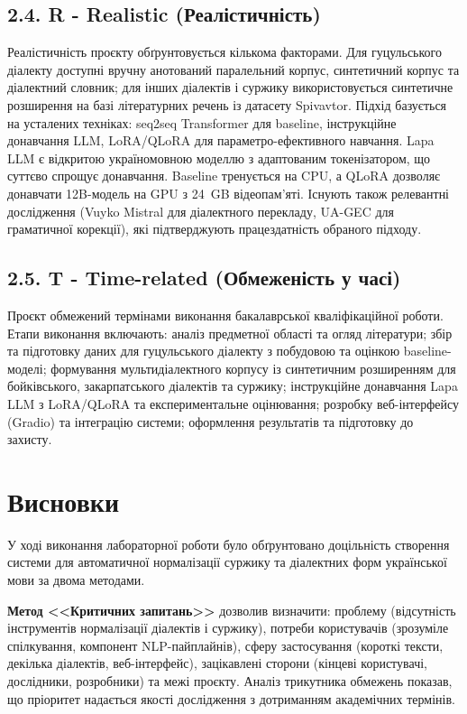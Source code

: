\documentclass[14pt]{extarticle}
\begin{document}
\subsection*{2.4. R - Realistic (Реалістичність)}

Реалістичність проєкту обґрунтовується кількома факторами. Для гуцульського діалекту доступні вручну анотований паралельний корпус, синтетичний корпус та діалектний словник; для інших діалектів і суржику використовується синтетичне розширення на базі літературних речень із датасету Spivavtor. Підхід базується на усталених техніках: seq2seq Transformer для baseline, інструкційне донавчання LLM, LoRA/QLoRA для параметро-ефективного навчання. Lapa LLM є відкритою україномовною моделлю з адаптованим токенізатором, що суттєво спрощує донавчання. Baseline тренується на CPU, а QLoRA дозволяє донавчати 12B-модель на GPU з 24~GB відеопам'яті. Існують також релевантні дослідження (Vuyko Mistral для діалектного перекладу, UA-GEC для граматичної корекції), які підтверджують працездатність обраного підходу.

\subsection*{2.5. T - Time-related (Обмеженість у часі)}

Проєкт обмежений термінами виконання бакалаврської кваліфікаційної роботи. Етапи виконання включають: аналіз предметної області та огляд літератури; збір та підготовку даних для гуцульського діалекту з побудовою та оцінкою baseline-моделі; формування мультидіалектного корпусу із синтетичним розширенням для бойківського, закарпатського діалектів та суржику; інструкційне донавчання Lapa LLM з LoRA/QLoRA та експериментальне оцінювання; розробку веб-інтерфейсу (Gradio) та інтеграцію системи; оформлення результатів та підготовку до захисту.

\section*{Висновки}

У ході виконання лабораторної роботи було обґрунтовано доцільність створення системи для автоматичної нормалізації суржику та діалектних форм української мови за двома методами.

\textbf{Метод <<Критичних запитань>>} дозволив визначити: проблему (відсутність інструментів нормалізації діалектів і суржику), потреби користувачів (зрозуміле спілкування, компонент NLP-пайплайнів), сферу застосування (короткі тексти, декілька діалектів, веб-інтерфейс), зацікавлені сторони (кінцеві користувачі, дослідники, розробники) та межі проєкту. Аналіз трикутника обмежень показав, що пріоритет надається якості дослідження з дотриманням академічних термінів.
\end{document}
